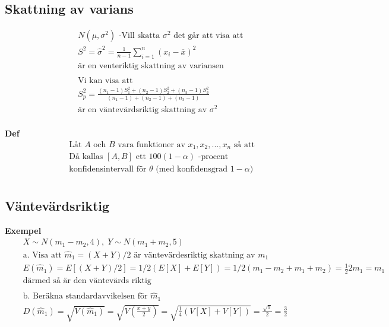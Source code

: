 \subsection{Skattning av varians}
\begin{align*}
  &\quad  N(\mu,\sigma^2) \text{ -Vill skatta $\sigma^2$ det går att visa att }  \\
  &\quad  S^2 = \hat{\sigma}^2 = \frac{1}{n-1}\sum_{i=1}^n (x_i-\overline{x})^2 \\
  &\quad  \text{är en venteriktig skattning av variansen }  \\
  &\quad  \\
  &\quad  \text{Vi kan visa att }  \\
  &\quad  S_p^2 = \frac{(n_1-1)S_1^2 + (n_2-1)S_2^2 + (n_3-1)S_3^2}{(n_1-1)+(n_2-1)+(n_3-1)}\\
  &\quad  \text{är en väntevärdsriktig skattning av } \sigma^2  \\
\end{align*}

\textbf{Def}
\begin{align*}
  &\quad  \text{Låt $A$ och $B$ vara funktioner av $x_1,x_2,...,x_n$ så att} \\
  &\quad  \text{Då kallas $[A,B]$ ett $100(1-\alpha)$ -procent} \\
  &\quad  \text{konfidensintervall för $\theta$ (med konfidensgrad $1-\alpha$)} \\
\end{align*}

\subsection{Väntevärdsriktig}
\textbf{Exempel}
\begin{align*}
  &\quad  X\sim{N(m_1-m_2, 4)}, \; Y\sim{N(m_1+m_2,5)} \\
  &\quad  \text{a. Visa att $\hat{m}_1=(X+Y)/2$ är väntevärdesriktig skattning av $m_1$} \\
  &\quad  E(\hat{m}_1) = E[(X+Y)/2] = 1/2(E[X]+E[Y]) = 1/2(m_1-m_2 + m_1+m_2)= \frac{1}{2}2m_1=m_1 \\
  &\quad  \text{därmed så är den väntevärds riktig} \\
  &\quad  \\
  &\quad  \text{b. Beräkna standardavvikelsen för $\hat{m}_1$} \\
  &\quad  D(\hat{m}_1) = \sqrt{V(\hat{m}_1)} = \sqrt{V(\frac{x+y}{2})} = \sqrt{\frac{1}{4}(V[X]+V[Y])} = \frac{\sqrt{9}}{2} = \frac{3}{2} \\
  &\quad  \\
\end{align*}


